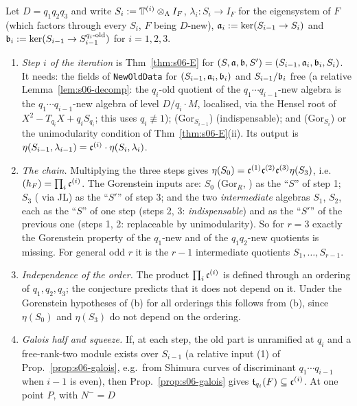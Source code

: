 \begin{remark}[the case $r=3$: which quotients must be Gorenstein]\label{rem:s06-several-r3}
Let $D=q_1q_2q_3$ and write $S_i:=\mathbb{T}^{(i)}\otimes_\Lambda I_F$, $\lambda_i:S_i\to I_F$ for the eigensystem of $F$ (which factors through every
$S_i$, $F$ being $D$-new), $\mathfrak{a}_i:=\ker(S_{i-1}\to S_i)$ and $\mathfrak{b}_i:=\ker(S_{i-1}\to S_{i-1}^{q_i\text{-old}})$ for $i=1,2,3$.
\begin{enumerate}[label=(\alph*)]
\item \emph{Step $i$ of the iteration} is Thm~\ref{thm:s06-E} for $(S,\mathfrak{a},\mathfrak{b},S')=(S_{i-1},\mathfrak{a}_i,\mathfrak{b}_i,S_i)$. It needs:
  the fields of \texttt{NewOldData} for $(S_{i-1},\mathfrak{a}_i,\mathfrak{b}_i)$ and $S_{i-1}/\mathfrak{b}_i$ free (a relative Lemma~\ref{lem:s06-decomp}: the
  $q_i$-old quotient of the $q_1\cdots q_{i-1}$-new algebra is the $q_1\cdots q_{i-1}$-new algebra of level $D/q_i\cdot M$, localised,
  via the Hensel root of $X^2-T_{q_i}X+q_iS_{q_i}$; this uses $q_i\not\equiv1$); (Gor$_{S_{i-1}}$) (indispensable); and (Gor$_{S_i}$) or the
  unimodularity condition of Thm~\ref{thm:s06-E}(ii). Its output is $\eta(S_{i-1},\lambda_{i-1})=\mathfrak{c}^{(i)}\cdot\eta(S_i,\lambda_i)$.
\item \emph{The chain.} Multiplying the three steps gives $\eta(S_0)=\mathfrak{c}^{(1)}\mathfrak{c}^{(2)}\mathfrak{c}^{(3)}\eta(S_3)$, i.e.\ $(h_F)=\prod_i\mathfrak{c}^{(i)}$. The
  Gorenstein inputs are: $S_0$ (Gor$_R$, \cite[\S3.3]{Hs}) as the ``$S$'' of step 1; $S_3$ (\cite[Thm~4.5]{Hs} via JL) as the ``$S'$'' of step 3;
  and the two \emph{intermediate} algebras $S_1$, $S_2$, each as the ``$S$'' of one step (steps 2, 3: \emph{indispensable}) and as the
  ``$S'$'' of the previous one (steps 1, 2: replaceable by unimodularity). So for $r=3$ exactly the Gorenstein property of the
  $q_1$-new and of the $q_1q_2$-new quotients is missing. For general odd $r$ it is the $r-1$ intermediate quotients $S_1,\dots,S_{r-1}$.
  \stsketch
\item \emph{Independence of the order.} The product $\prod_i\mathfrak{c}^{(i)}$ is defined through an ordering of $q_1,q_2,q_3$; the conjecture
  predicts that it does not depend on it. Under the Gorenstein hypotheses of (b) for all orderings this follows from (b), since
  $\eta(S_0)$ and $\eta(S_3)$ do not depend on the ordering. \stsketch
\item \emph{Galois half and squeeze.} If, at each step, the old part is unramified at $q_i$ and a free-rank-two module exists over
  $S_{i-1}$ (a relative input (1) of Prop.~\ref{prop:s06-galois}, e.g.\ from Shimura curves of discriminant $q_1\cdots q_{i-1}$ when
  $i-1$ is even), then Prop.~\ref{prop:s06-galois} gives $\mathfrak{t}_{q_i}(F)\subseteq\mathfrak{c}^{(i)}$. At one point $P$, \cite[Thm~1.1]{KO} with $N^-=D$

\end{enumerate}
\end{remark}
